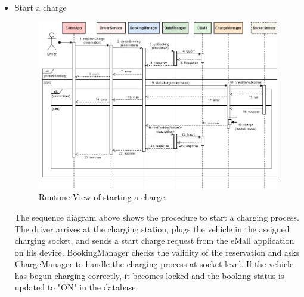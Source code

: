 \documentclass[../main.tex]{subfiles}
\begin{document}
\begin{itemize}
    \newpage
    \item Start a charge
    {
    \vspace{2em}
    \begin{figure}[H]
    \centering
    \includegraphics[width=\textwidth]{runtimeview/rv_startCharge.png}
    \caption{Runtime View of starting a charge}
    \label{fig:rv_start}
    \end{figure}}
    The sequence diagram above shows the procedure to start a charging process. The driver arrives at the charging station, plugs the vehicle in the assigned charging socket, and sends a start charge request from the eMall application on his device. BookingManager checks the validity of the reservation and asks ChargeManager to handle the charging process at socket level. If the vehicle has begun charging correctly, it becomes locked and the booking status is updated to "ON" in the database.


\end{itemize}
\end{document}

